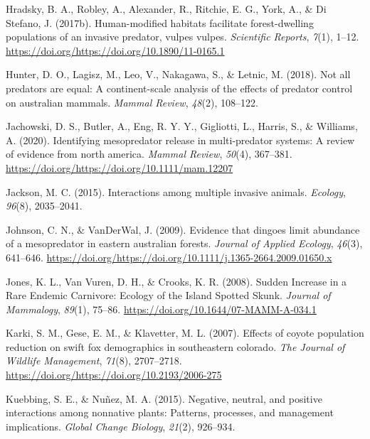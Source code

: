 \documentclass[]{elsarticle} %
\begin{document}
\leavevmode\hypertarget{ref-hradsky2017human}{}%
Hradsky, B. A., Robley, A., Alexander, R., Ritchie, E. G., York, A., \& Di Stefano, J. (2017b). Human-modified habitats facilitate forest-dwelling populations of an invasive predator, vulpes vulpes. \emph{Scientific Reports}, \emph{7}(1), 1--12. \url{https://doi.org/https://doi.org/10.1890/11-0165.1}

\leavevmode\hypertarget{ref-hunter2018}{}%
Hunter, D. O., Lagisz, M., Leo, V., Nakagawa, S., \& Letnic, M. (2018). Not all predators are equal: A continent-scale analysis of the effects of predator control on australian mammals. \emph{Mammal Review}, \emph{48}(2), 108--122.

\leavevmode\hypertarget{ref-https:ux2fux2fdoi.orgux2f10.1111ux2fmam.12207}{}%
Jachowski, D. S., Butler, A., Eng, R. Y. Y., Gigliotti, L., Harris, S., \& Williams, A. (2020). Identifying mesopredator release in multi-predator systems: A review of evidence from north america. \emph{Mammal Review}, \emph{50}(4), 367--381. \url{https://doi.org/https://doi.org/10.1111/mam.12207}

\leavevmode\hypertarget{ref-jackson2015}{}%
Jackson, M. C. (2015). Interactions among multiple invasive animals. \emph{Ecology}, \emph{96}(8), 2035--2041.

\leavevmode\hypertarget{ref-https:ux2fux2fdoi.orgux2f10.1111ux2fj.1365-2664.2009.01650.x}{}%
Johnson, C. N., \& VanDerWal, J. (2009). Evidence that dingoes limit abundance of a mesopredator in eastern australian forests. \emph{Journal of Applied Ecology}, \emph{46}(3), 641--646. \url{https://doi.org/https://doi.org/10.1111/j.1365-2664.2009.01650.x}

\leavevmode\hypertarget{ref-jones2008sudden}{}%
Jones, K. L., Van Vuren, D. H., \& Crooks, K. R. (2008). Sudden Increase in a Rare Endemic Carnivore: Ecology of the Island Spotted Skunk. \emph{Journal of Mammalogy}, \emph{89}(1), 75--86. \url{https://doi.org/10.1644/07-MAMM-A-034.1}

\leavevmode\hypertarget{ref-karki2007}{}%
Karki, S. M., Gese, E. M., \& Klavetter, M. L. (2007). Effects of coyote population reduction on swift fox demographics in southeastern colorado. \emph{The Journal of Wildlife Management}, \emph{71}(8), 2707--2718. \url{https://doi.org/https://doi.org/10.2193/2006-275}

\leavevmode\hypertarget{ref-kuebbing2015}{}%
Kuebbing, S. E., \& Nuñez, M. A. (2015). Negative, neutral, and positive interactions among nonnative plants: Patterns, processes, and management implications. \emph{Global Change Biology}, \emph{21}(2), 926--934.
\end{document}
